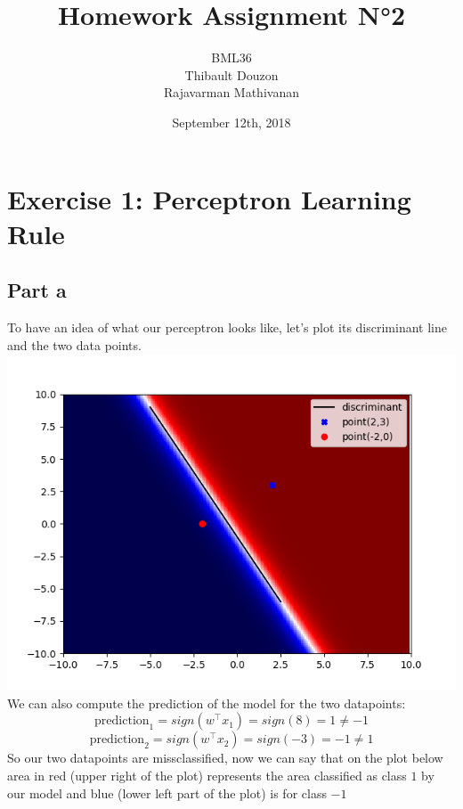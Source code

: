 \documentclass[a4paper, 10pt]{article}
\title{Homework Assignment N°2}
\author{BML36\\Thibault Douzon\\Rajavarman Mathivanan}
\date{September 12th, 2018}
\begin{document}
\maketitle
\pagebreak
\tableofcontents
\pagebreak
\section{Exercise 1: Perceptron Learning Rule}
\subsection{Part a} 
To have an idea of what our perceptron looks like, let's plot its discriminant line 
and the two data points. 
\\ 
\includegraphics[scale=0.6]{ex1_a.png} 
\\ 
We can also compute the prediction of the model for the two datapoints: 
$$ 
\text{prediction}_1 = sign(w^\top x_1) = sign(8) = 1 \ne -1 
$$ 
$$ 
\text{prediction}_2 = sign(w^\top x_2) = sign(-3) = -1 \ne 1 
$$ 
So our two datapoints are missclassified, now we can say that on the plot below 
area in red (upper right of the plot) represents the area classified as class $1$ by our model and 
blue (lower left part of the plot) is for class $-1$ 
\end{document}
